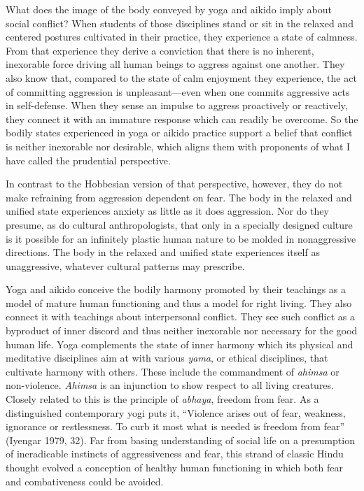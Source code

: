 What does the image of the body conveyed by yoga and aikido imply about social conflict? When students of those disciplines stand or sit in the relaxed and centered postures cultivated in their practice, they experience a state of calmness. From that experience they derive a conviction that there is no inherent, inexorable force driving all human beings to aggress against one another. They also know that, compared to the state of calm enjoyment they experience, the act of committing aggression is unpleasant---even when one commits aggressive acts in self-defense. When they sense an impulse to aggress proactively or reactively, they connect it with an immature response which can readily be overcome. So the bodily states experienced in yoga or aikido practice support a belief that conflict is neither inexorable nor desirable, which aligns them with proponents of what I have called the prudential perspective.

In contrast to the Hobbesian version of that perspective, however, they do not make refraining from aggression dependent on fear. The body in the relaxed and unified state experiences anxiety as little as it does aggression. Nor do they presume, as do cultural anthropologists, that only in a specially designed culture is it possible for an infinitely plastic human nature to be molded in nonaggressive directions. The body in the relaxed and unified state experiences itself as unaggressive, whatever cultural patterns may prescribe. 

Yoga and aikido conceive the bodily harmony promoted by their teachings as a model of mature human functioning and thus a model for right living. They also connect it with teachings about interpersonal conflict. They see such conflict as a byproduct of inner discord and thus neither inexorable nor necessary for the good human life. Yoga complements the state of inner harmony which its physical and meditative disciplines aim at with various \emph{yama}, or ethical disciplines, that cultivate harmony with others. These include the commandment of \emph{ahimsa} or non-violence. \emph{Ahimsa} is an injunction to show respect to all living creatures. Closely related to this is the principle of \emph{abhaya}, freedom from fear. As a distinguished contemporary yogi puts it, ``Violence arises out of fear, weakness, ignorance or restlessness. To curb it most what is needed is freedom from fear'' (Iyengar 1979, 32). Far from basing understanding of social life on a presumption of ineradicable instincts of aggressiveness and fear, this strand of classic Hindu thought evolved a conception of healthy human functioning in which both fear and combativeness could be avoided.

